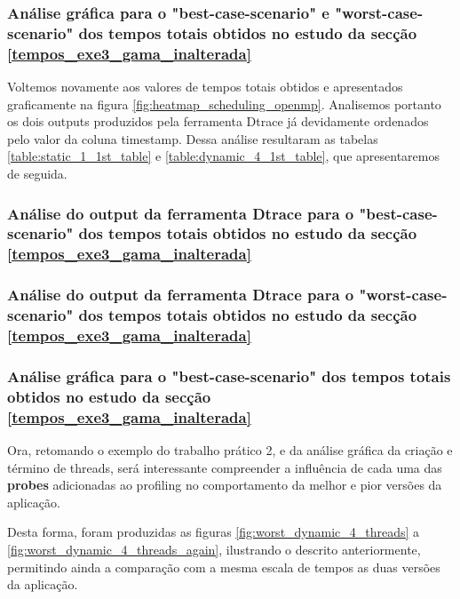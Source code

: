 \documentclass[a4paper]{article}
\begin{document}
     \subsubsection{Análise gráfica para o "best-case-scenario" e  "worst-case-scenario" dos tempos totais obtidos no estudo da secção \ref{tempos_exe3_gama_inalterada}}
 
  Voltemos novamente aos valores de tempos totais obtidos e apresentados graficamente na figura \ref{fig:heatmap_scheduling_openmp}. Analisemos portanto os dois outputs produzidos pela ferramenta Dtrace já devidamente ordenados pelo valor da coluna timestamp. Dessa análise resultaram as tabelas \ref{table:static_1_1st_table} e \ref{table:dynamic_4_1st_table}, que apresentaremos de seguida.
  
   \subsubsection{Análise do output da ferramenta Dtrace para o "best-case-scenario" dos tempos totais obtidos no estudo da secção \ref{tempos_exe3_gama_inalterada}}
        
   
     \subsubsection{Análise do output da ferramenta Dtrace para o "worst-case-scenario" dos tempos totais obtidos no estudo da secção \ref{tempos_exe3_gama_inalterada}}
     
     
     
    
       \subsubsection{Análise gráfica para o "best-case-scenario" dos tempos totais obtidos no estudo da secção \ref{tempos_exe3_gama_inalterada}}
       
         Ora, retomando o exemplo do trabalho prático 2, e da análise gráfica da criação e término de threads, será interessante compreender a influência de cada uma das \textbf{probes} adicionadas ao profiling no comportamento da melhor e pior versões da aplicação. \par
        Desta forma, foram produzidas as figuras \ref{fig:worst_dynamic_4_threads} a \ref{fig:worst_dynamic_4_threads_again}, ilustrando o descrito anteriormente, permitindo ainda a comparação com a mesma escala de tempos as duas versões da aplicação.\par 
        
\end{document}
